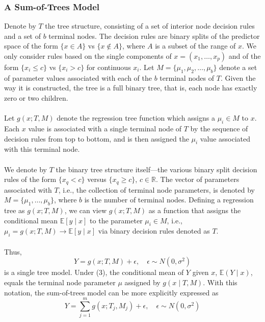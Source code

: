 \documentclass[a4paper,11pt]{article}
\begin{document}
\subsubsection{A Sum-of-Trees Model}
Denote by \( T \) the tree structure, consisting of a set of interior node decision rules and a set of $b$ terminal nodes. The decision rules are binary splits of the predictor space of the form \( \{x \in A\} \) vs \( \{x \notin A\} \), where \( A \) is a subset of the range of \( x \). We only consider rules based on the single components of \( x = (x_1, \dots, x_p) \) and of the form \( \{x_i \leq c\} \) vs \( \{x_i > c\} \) for continuous \( x_i \). Let \( M = \{\mu_1, \mu_2, \dots, \mu_b\} \) denote a set of parameter values associated with each of the \( b \) terminal nodes of \( T \). Given the way it is constructed, the tree is a full binary tree, that is, each node has exactly zero or two children. 
\\\\ Let \( g(x; T, M) \) denote the regression tree function which assigns a \( \mu_i \in M \) to \( x \).
Each \( x \) value is associated with a single terminal node of \( T \) by the sequence of decision rules from top to bottom, and is then assigned the \( \mu_i \) value associated with this terminal node. 
\\\\We denote by \( T \) the binary tree structure itself—the various binary split decision rules of the form \( \{x_q < c\} \) versus \( \{x_q \geq c\} \), \( c \in \mathbb{R} \). The vector of parameters associated with \( T \), i.e., the collection of terminal node parameters, is denoted by \( M = \{\mu_1, \ldots, \mu_b\} \), where \( b \) is the number of terminal nodes. Defining a regression tree as \( g(x; T, M) \), we can view \( g(x; T, M) \) as a function that assigns the conditional mean \( \mathbb{E}[y \mid x] \) to the parameter \( \mu_i \in M \), i.e., \( \mu_i = g(x; T, M) \rightarrow \mathbb{E}[y \mid x] \) via binary decision rules denoted as \( T \).
\\\\Thus,
\begin{equation}
Y = g(x; T, M) + \epsilon, \quad \epsilon \sim N(0, \sigma^2)
\end{equation}
is a single tree model. Under (3), the conditional mean of \( Y \) given \( x \), \( \mathbb{E}(Y \mid x) \), equals the terminal node parameter \( \mu \) assigned by \( g(x \mid T, M) \).
With this notation, the sum-of-trees model can be more explicitly expressed as
\begin{equation}
Y = \sum_{j=1}^m g(x; T_j, M_j) + \epsilon, \quad \epsilon \sim N(0, \sigma^2) \label{likelihood}
\end{equation}
\end{document}
